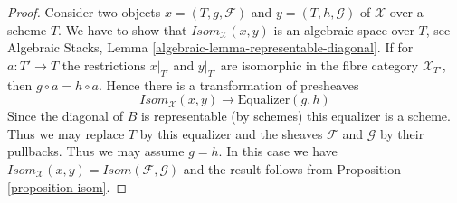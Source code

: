 \documentclass{stacks-project}
\theoremstyle{plain}
\theoremstyle{definition}
\theoremstyle{remark}
\numberwithin{equation}{subsection}
\begin{document}
\begin{proof}
Consider two objects $x = (T, g, \mathcal{F})$ and $y = (T, h, \mathcal{G})$
of $\mathcal{X}$ over a scheme $T$. We have to show that
$\mathit{Isom}_\mathcal{X}(x, y)$ is an algebraic space over $T$, see
Algebraic Stacks, Lemma \ref{algebraic-lemma-representable-diagonal}.
If for $a : T' \to T$ the restrictions $x|_{T'}$ and $y|_{T'}$ are isomorphic
in the fibre category $\mathcal{X}_{T'}$, then $g \circ a = h \circ a$.
Hence there is a transformation of presheaves
$$
\mathit{Isom}_\mathcal{X}(x, y) \longrightarrow \text{Equalizer}(g, h)
$$
Since the diagonal of $B$ is representable (by schemes) this equalizer is
a scheme. Thus we may replace $T$ by this equalizer and the sheaves
$\mathcal{F}$ and $\mathcal{G}$ by their pullbacks. Thus we may assume
$g = h$. In this case we have
$\mathit{Isom}_\mathcal{X}(x, y) = \mathit{Isom}(\mathcal{F}, \mathcal{G})$
and the result follows from Proposition \ref{proposition-isom}.
\end{proof}
\end{document}
